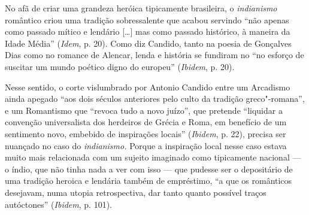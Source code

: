 No afã de criar uma grandeza heróica tipicamente brasileira, o
\emph{indianismo} romântico criou uma tradição sobressalente que acabou
servindo ``não apenas como passado mítico e lendário [\ldots{}] mas como
passado histórico, à maneira da Idade Média'' (\emph{Idem}, p. 20). Como
diz Candido, tanto na poesia de Gonçalves Dias como no romance de
Alencar, lenda e história se fundiram no ``no esforço de suscitar um
mundo poético digno do europeu'' (\emph{Ibidem}, p. 20).

Nesse sentido, o corte vislumbrado por Antonio Candido entre um
Arcadismo ainda apegado ``aos dois séculos anteriores pelo culto da
tradição greco"-romana'', e um Romantismo que ``revoca tudo a novo
juízo'', que pretende ``liquidar a convenção universalista dos herdeiros
de Grécia e Roma, em benefício de um sentimento novo, embebido de
inspirações locais'' (\emph{Ibidem}, p. 22), precisa ser nuançado no
caso do \emph{indianismo.} Porque a inspiração local nesse caso estava
muito mais relacionada com um sujeito imaginado como tipicamente
nacional --- o índio, que não tinha nada a ver com isso --- que pudesse
ser o depositário de uma tradição heroica e lendária também de
empréstimo, ``a que os românticos desejavam, numa utopia retrospectiva,
dar tanto quanto possível traços autóctones'' (\emph{Ibidem}, p. 101).

